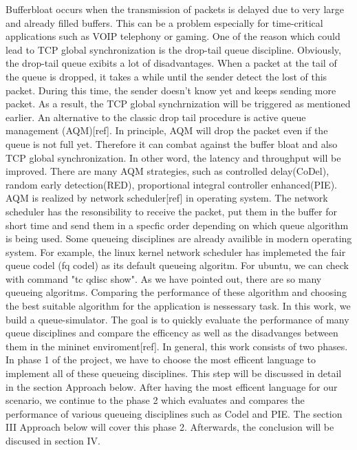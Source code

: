 Bufferbloat occurs when the transmission of packets is delayed due to very large and already filled buffers. This can be a problem especially for time-critical applications such as VOIP telephony or gaming.\newline
One of the reason which could lead to TCP global synchronization is the drop-tail queue discipline. Obviously, the drop-tail queue exibits a lot of disadvantages. When a packet at the tail of the queue is dropped, it takes a while until the sender detect the lost of this packet. During this time, the sender doesn't know yet and keeps sending more packet. As a result, the TCP global synchrnization will be triggered as mentioned earlier. An alternative to the classic drop tail procedure is active queue management (AQM)[ref]. In principle, AQM will drop the packet even if the queue is not full yet. Therefore it can combat against the buffer bloat and also TCP global synchronization. In other word, the latency and throughput will be improved. There are many AQM strategies, such as controlled delay(CoDel), random early detection(RED), proportional integral controller enhanced(PIE). AQM is realized by network scheduler[ref] in operating system. The network scheduler has the resonsibility to receive the packet, put them in the buffer for short time and send them in a specfic order depending on which queue algorithm is being used. Some queueing disciplines are already availible in modern operating system. For example, the linux kernel network scheduler has implemeted the fair queue codel (fq codel) as its default queueing algoritm. For ubuntu, we can check with command "tc qdisc show".\newline 
As we have pointed out, there are so many queueing algoritms. Comparing the performance of these algorithm and choosing the best suitable algorithm for the application is nessessary task. In this work, we build a queue-simulator. The goal is to quickly evaluate the performance of many queue disciplines and compare the efficency as well as the disadvanges between them in the mininet enviroment[ref]. In general, this work consists of two phases. In phase 1 of the project, we have to choose the most efficent language to implement all of these queueing disciplines. This step will be discussed in detail in the section Approach below. After having the most efficent language for our scenario, we continue to the phase 2 which evaluates and compares the performance of various queueing disciplines such as Codel and PIE. The section III Approach below will cover this phase 2. Afterwards, the conclusion will be discused in section IV. \newline 

